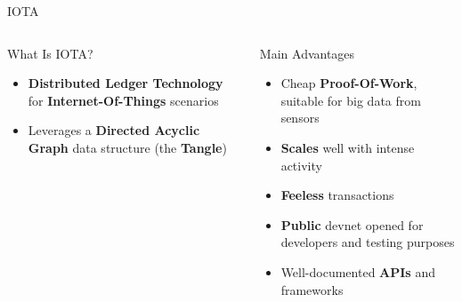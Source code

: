 \begin{frame}{IOTA}
    \begin{columns}
        \begin{block}{What Is IOTA?}
            \begin{itemize}
                \item \textbf{Distributed Ledger Technology} for \textbf{Internet-Of-Things} scenarios
                \item Leverages a \textbf{Directed Acyclic Graph} data structure (the \textbf{Tangle})
            \end{itemize}
        \end{block}
        
        \vspace{5pt}
        
        \begin{block}{Main Advantages}
            \begin{itemize}
                \item Cheap \textbf{Proof-Of-Work}, suitable for big data from sensors
                \item \textbf{Scales} well with intense activity
                \item \textbf{Feeless} transactions
                \item \textbf{Public} devnet opened for developers and testing purposes
                \item Well-documented \textbf{APIs} and frameworks
            \end{itemize}
        \end{block}
        
    \column{0pt}
        

\end{columns}
\end{frame}
